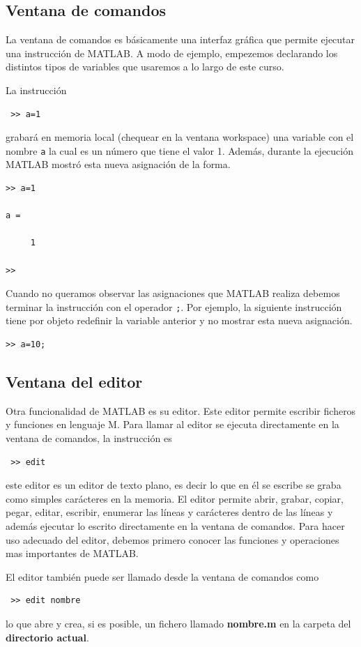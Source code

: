 \documentclass[11pt]{article}
\begin{document}
\subsection{Ventana de comandos}
La ventana de comandos es b\'asicamente una interfaz gr\'afica que permite ejecutar una instrucci\'on de MATLAB.
A modo de ejemplo, empezemos declarando los distintos tipos de variables que usaremos a lo largo de este curso.

La instrucci\'on
\begin{verbatim}
 >> a=1
\end{verbatim}
grabar\'a en memoria local (chequear en la ventana workspace) una variable con el nombre \texttt{a} la cual es un n\'umero 
que tiene el valor 1. Adem\'as, durante la ejecuci\'on MATLAB mostr\'o esta nueva asignaci\'on de la forma.
\begin{verbatim}
>> a=1

a =

     1

>>
\end{verbatim}
Cuando no queramos observar las asignaciones que MATLAB realiza debemos terminar la instrucci\'on con el operador \texttt{;}. 
Por ejemplo, la siguiente instrucci\'on tiene por objeto redefinir la variable anterior y no mostrar esta nueva asignaci\'on.
\begin{verbatim}
>> a=10;
\end{verbatim}
%
\subsection{Ventana del editor}
Otra funcionalidad de MATLAB es su editor. Este editor permite escribir ficheros y funciones en lenguaje M. Para llamar 
al editor se ejecuta directamente en la ventana de comandos, la instrucci\'on es 
\begin{verbatim}
 >> edit
\end{verbatim}
este editor es un editor de texto plano, es decir lo que en \'el se escribe se graba como simples car\'acteres en la memoria. 
El editor permite abrir, grabar, copiar, pegar, editar, escribir, enumerar las l\'ineas y car\'acteres dentro de las l\'ineas y 
adem\'as ejecutar lo escrito directamente en la ventana de comandos. Para hacer uso adecuado del editor, debemos primero conocer 
las funciones y operaciones mas importantes de MATLAB.

El editor tambi\'en puede ser llamado desde la ventana de comandos como
\begin{verbatim}
 >> edit nombre
\end{verbatim}
lo que abre y crea, si es posible, un fichero llamado \textbf{nombre.m} en la carpeta del \textbf{directorio actual}.
\end{document}
